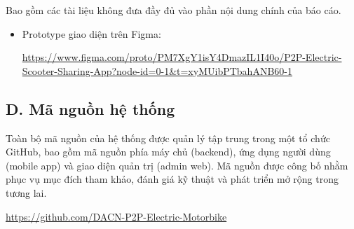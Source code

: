 Bao gồm các tài liệu không đưa đầy đủ vào phần nội dung chính của báo cáo.

\begin{itemize}
    \item Prototype giao diện trên Figma:  
    
    \url{https://www.figma.com/proto/PM7XgY1isY4DmazIL1I40o/P2P-Electric-Scooter-Sharing-App?node-id=0-1&t=xyMUibPTbahANB60-1}


\end{itemize}

\vspace{10pt}

\subsection*{D. Mã nguồn hệ thống}

Toàn bộ mã nguồn của hệ thống được quản lý tập trung trong một tổ chức GitHub, bao gồm mã nguồn phía máy chủ (backend), ứng dụng người dùng (mobile app) và giao diện quản trị (admin web).  
Mã nguồn được công bố nhằm phục vụ mục đích tham khảo, đánh giá kỹ thuật và phát triển mở rộng trong tương lai.

\url{https://github.com/DACN-P2P-Electric-Motorbike}
